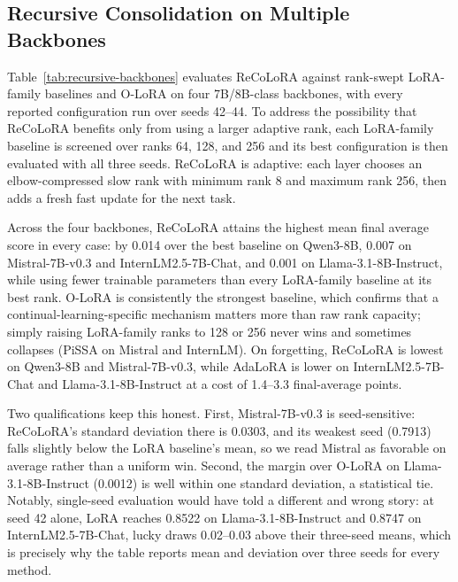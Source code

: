 \documentclass[11pt]{article}
\begin{document}
\subsection{Recursive Consolidation on Multiple Backbones}
\label{sec:recursive-results}
Table~\ref{tab:recursive-backbones} evaluates ReCoLoRA against rank-swept LoRA-family baselines and O-LoRA on four 7B/8B-class backbones, with every reported configuration run over seeds 42--44. To address the possibility that ReCoLoRA benefits only from using a larger adaptive rank, each LoRA-family baseline is screened over ranks 64, 128, and 256 and its best configuration is then evaluated with all three seeds. ReCoLoRA is adaptive: each layer chooses an elbow-compressed slow rank with minimum rank 8 and maximum rank 256, then adds a fresh fast update for the next task.

Across the four backbones, ReCoLoRA attains the highest mean final average score in every case: by 0.014 over the best baseline on Qwen3-8B, 0.007 on Mistral-7B-v0.3 and InternLM2.5-7B-Chat, and 0.001 on Llama-3.1-8B-Instruct, while using fewer trainable parameters than every LoRA-family baseline at its best rank. O-LoRA is consistently the strongest baseline, which confirms that a continual-learning-specific mechanism matters more than raw rank capacity; simply raising LoRA-family ranks to 128 or 256 never wins and sometimes collapses (PiSSA on Mistral and InternLM). On forgetting, ReCoLoRA is lowest on Qwen3-8B and Mistral-7B-v0.3, while AdaLoRA is lower on InternLM2.5-7B-Chat and Llama-3.1-8B-Instruct at a cost of 1.4--3.3 final-average points.

Two qualifications keep this honest. First, Mistral-7B-v0.3 is seed-sensitive: ReCoLoRA's standard deviation there is 0.0303, and its weakest seed (0.7913) falls slightly below the LoRA baseline's mean, so we read Mistral as favorable on average rather than a uniform win. Second, the margin over O-LoRA on Llama-3.1-8B-Instruct (0.0012) is well within one standard deviation, a statistical tie. Notably, single-seed evaluation would have told a different and wrong story: at seed 42 alone, LoRA reaches 0.8522 on Llama-3.1-8B-Instruct and 0.8747 on InternLM2.5-7B-Chat, lucky draws 0.02--0.03 above their three-seed means, which is precisely why the table reports mean and deviation over three seeds for every method.
\end{document}
